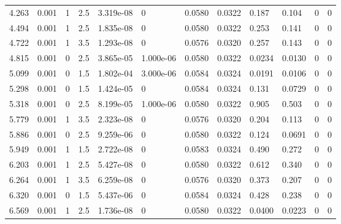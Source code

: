 \documentclass[preview]{standalone}
\begin{document}
{{\begin{tabular}{L{1.2cm}C{1.2cm} C{0.3cm}C{0.5cm} C{1.4cm}C{1.4cm} C{1.4cm}C{1.4cm} C{1.6cm}C{1.6cm} C{1.6cm}C{1.6cm}}
  4.263  &  0.001  & 1     & 2.5 &  3.319e-08  & 0  &  0.0580&   0.0322& 0.187 & 0.104   &  0 & 0  \\ 
  4.494  &  0.001  & 1     & 2.5 &  1.835e-08  & 0  &  0.0580&   0.0322& 0.253 & 0.141   &  0 & 0  \\ 
  4.722  &  0.001  & 1     & 3.5 &  1.293e-08  & 0  &  0.0576&   0.0320& 0.257 & 0.143   &  0 & 0  \\ 
  4.815  &  0.001  & 0     & 2.5 &  3.865e-05  & 1.000e-06  &  0.0580&   0.0322& 0.0234 & 0.0130   &  0 & 0  \\ 
  5.099  &  0.001  & 0     & 1.5 &  1.802e-04  & 3.000e-06  &  0.0584&   0.0324& 0.0191 & 0.0106   &  0 & 0  \\ 
  5.298  &  0.001  & 0     & 1.5 &  1.424e-05  & 0  &  0.0584&   0.0324& 0.131 & 0.0729   &  0 & 0  \\ 
  5.318  &  0.001  & 0     & 2.5 &  8.199e-05  & 1.000e-06  &  0.0580&   0.0322& 0.905 & 0.503   &  0 & 0  \\ 
  5.779  &  0.001  & 1     & 3.5 &  2.323e-08  & 0  &  0.0576&   0.0320& 0.204 & 0.113   &  0 & 0  \\ 
  5.886  &  0.001  & 0     & 2.5 &  9.259e-06  & 0  &  0.0580&   0.0322& 0.124 & 0.0691   &  0 & 0  \\ 
  5.949  &  0.001  & 1     & 1.5 &  2.722e-08  & 0  &  0.0583&   0.0324& 0.490 & 0.272   &  0 & 0  \\ 
  6.203  &  0.001  & 1     & 2.5 &  5.427e-08  & 0  &  0.0580&   0.0322& 0.612 & 0.340   &  0 & 0  \\ 
  6.264  &  0.001  & 1     & 3.5 &  6.259e-08  & 0  &  0.0576&   0.0320& 0.373 & 0.207   &  0 & 0  \\ 
  6.320  &  0.001  & 0     & 1.5 &  5.437e-06  & 0  &  0.0584&   0.0324& 0.428 & 0.238   &  0 & 0  \\ 
  6.569  &  0.001  & 1     & 2.5 &  1.736e-08  & 0  &  0.0580&   0.0322& 0.0400 & 0.0223   &  0 & 0  \\ 
\hline 
\end{tabular} 

}}
\end{document}
